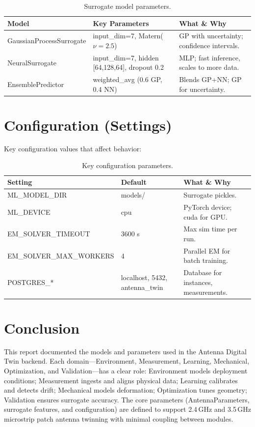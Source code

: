 \documentclass[11pt,a4paper]{article}
\begin{document}
\begin{table}[htbp]
\centering
\small
\begin{tabularx}{\textwidth}{@{}lXX@{}}
\toprule
\textbf{Model} & \textbf{Key Parameters} & \textbf{What \& Why} \\
\midrule
GaussianProcessSurrogate & input\_dim=7, Matern($\nu=2.5$) & GP with uncertainty; confidence intervals. \\
NeuralSurrogate & input\_dim=7, hidden [64,128,64], dropout 0.2 & MLP; fast inference, scales to more data. \\
EnsemblePredictor & weighted\_avg (0.6 GP, 0.4 NN) & Blends GP+NN; GP for uncertainty. \\
\bottomrule
\end{tabularx}
\caption{Surrogate model parameters.}
\end{table}

\section{Configuration (Settings)}

Key configuration values that affect behavior:

\begin{table}[htbp]
\centering
\small
\begin{tabularx}{\textwidth}{@{}lXX@{}}
\toprule
\textbf{Setting} & \textbf{Default} & \textbf{What \& Why} \\
\midrule
ML\_MODEL\_DIR & models/ & Surrogate pickles. \\
ML\_DEVICE & cpu & PyTorch device; cuda for GPU. \\
EM\_SOLVER\_TIMEOUT & 3600 s & Max sim time per run. \\
EM\_SOLVER\_MAX\_WORKERS & 4 & Parallel EM for batch training. \\
POSTGRES\_* & localhost, 5432, antenna\_twin & Database for instances, measurements. \\
\bottomrule
\end{tabularx}
\caption{Key configuration parameters.}
\end{table}

\section{Conclusion}

This report documented the models and parameters used in the Antenna Digital Twin backend. Each domain---Environment, Measurement, Learning, Mechanical, Optimization, and Validation---has a clear role: Environment models deployment conditions; Measurement ingests and aligns physical data; Learning calibrates and detects drift; Mechanical models deformation; Optimization tunes geometry; Validation ensures surrogate accuracy. The core parameters (AntennaParameters, surrogate features, and configuration) are defined to support 2.4\,GHz and 3.5\,GHz microstrip patch antenna twinning with minimal coupling between modules.
\end{document}
